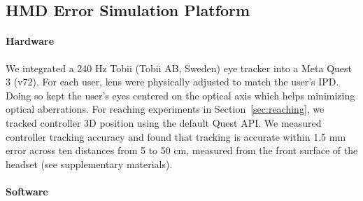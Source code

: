 \subsection{HMD Error Simulation Platform} \label{sec:hmd_platform}
\paragraph{Hardware}
We integrated a 240 Hz Tobii (Tobii AB, Sweden) eye tracker into a Meta Quest 3 (v72). For each user, lens were physically adjusted to match the user's IPD. Doing so kept the user’s eyes
centered on the optical axis which helps minimizing optical aberrations. For reaching experiments in Section~\ref{sec:reaching}, we tracked controller 3D position using the default Quest API. We measured controller tracking accuracy and found that tracking is accurate within 1.5 mm error across ten distances from 5 to 50 cm, measured from the front surface of the headset (see supplementary materials). 

\paragraph{Software} 


